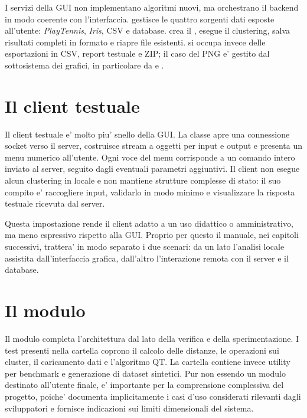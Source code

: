 I servizi della GUI non implementano algoritmi nuovi, ma orchestrano il backend in modo
coerente con l'interfaccia.  gestisce le quattro sorgenti dati
esposte all'utente: \emph{PlayTennis}, \emph{Iris}, CSV e database.
 crea il , esegue il clustering, salva
risultati completi in formato  e riapre file esistenti.
 si occupa invece delle esportazioni in CSV, report testuale e ZIP;
il caso del PNG e' gestito dal sottosistema dei grafici, in particolare da
 e .

\section{Il client testuale }

Il client testuale e' molto piu' snello della GUI. La classe  apre una
connessione socket verso il server, costruisce stream a oggetti per input e output e
presenta un menu numerico all'utente. Ogni voce del menu corrisponde a un comando intero
inviato al server, seguito dagli eventuali parametri aggiuntivi. Il client non esegue
alcun clustering in locale e non mantiene strutture complesse di stato: il suo compito e'
raccogliere input, validarlo in modo minimo e visualizzare la risposta testuale ricevuta dal server.

Questa impostazione rende il client adatto a un uso didattico o amministrativo, ma meno
espressivo rispetto alla GUI. Proprio per questo il manuale, nei capitoli successivi,
trattera' in modo separato i due scenari: da un lato l'analisi locale assistita
dall'interfaccia grafica, dall'altro l'interazione remota con il server e il database.

\section{Il modulo }

Il modulo  completa l'architettura dal lato della verifica e della
sperimentazione. I test presenti nella cartella  coprono il calcolo
delle distanze, le operazioni sui cluster, il caricamento dati e l'algoritmo QT. La
cartella  contiene invece utility per benchmark e generazione di
dataset sintetici. Pur non essendo un modulo destinato all'utente finale, 
e' importante per la comprensione complessiva del progetto, poiche' documenta
implicitamente i casi d'uso considerati rilevanti dagli sviluppatori e fornisce
indicazioni sui limiti dimensionali del sistema.
